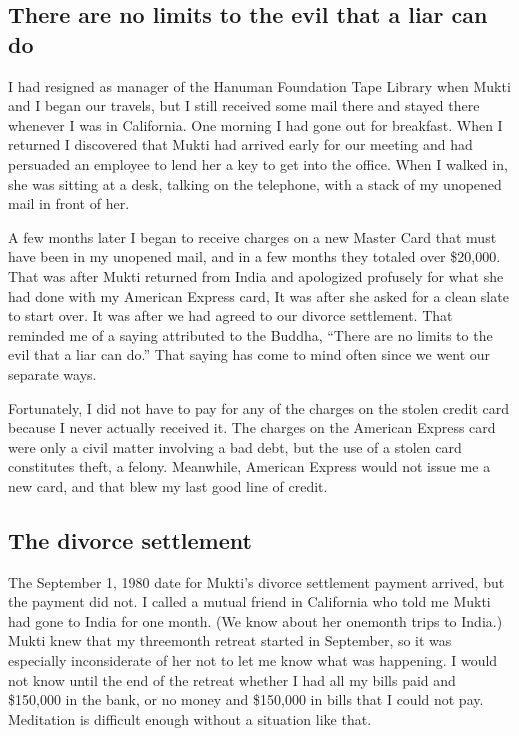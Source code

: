 \documentclass[a5paper,10pt,english]{book}
\begin{document}
\subsection{There are no limits to the evil that a liar can do}
\label{\detokenize{psychopaths:there-are-no-limits-to-the-evil-that-a-liar-can-do}}
\sphinxAtStartPar
I had resigned as manager of the Hanuman Foundation Tape Library
when Mukti and I began our travels, but I still received some mail there
and stayed there whenever I was in California. One morning I had gone
out for breakfast. When I returned I discovered that Mukti had arrived
early for our meeting and had persuaded an employee to lend her a key to
get into the office. When I walked in, she was sitting at a desk,
talking on the telephone, with a stack of my unopened mail in front of
her.

\sphinxAtStartPar
A few months later I began to receive charges on a new Master Card that
must have been in my unopened mail, and in a few months they totaled
over \$20,000. That was after Mukti returned from India and apologized
profusely for what she had done with my American Express card, It was
after she asked for a clean slate to start over. It was after we had
agreed to our divorce settlement. That reminded me of a saying
attributed to the Buddha, “There are no limits to the evil that a liar
can do.” That saying has come to mind often since we went our separate
ways.

\sphinxAtStartPar
Fortunately, I did not have to pay for any of the charges on the stolen
credit card because I never actually received it. The charges on the
American Express card were only a civil matter involving a bad debt, but
the use of a stolen card constitutes theft, a felony. Meanwhile,
American Express would not issue me a new card, and that blew my last
good line of credit.


\subsection{The divorce settlement}
\label{\detokenize{psychopaths:the-divorce-settlement}}
\sphinxAtStartPar
The September 1, 1980 date for Mukti’s divorce settlement payment
arrived, but the payment did not. I called a mutual friend in California
who told me Mukti had gone to India for one month. (We know about her
one\sphinxhyphen{}month trips to India.) Mukti knew that my three\sphinxhyphen{}month retreat
started in September, so it was especially inconsiderate of her not to
let me know what was happening. I would not know until the end of the
retreat whether I had all my bills paid and \$150,000 in the bank, or no
money and \$150,000 in bills that I could not pay. Meditation is
difficult enough without a situation like that.
\end{document}
